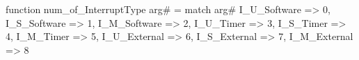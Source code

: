 function num_of_InterruptType arg# = match arg# {
  I_U_Software => 0,
  I_S_Software => 1,
  I_M_Software => 2,
  I_U_Timer => 3,
  I_S_Timer => 4,
  I_M_Timer => 5,
  I_U_External => 6,
  I_S_External => 7,
  I_M_External => 8
}
